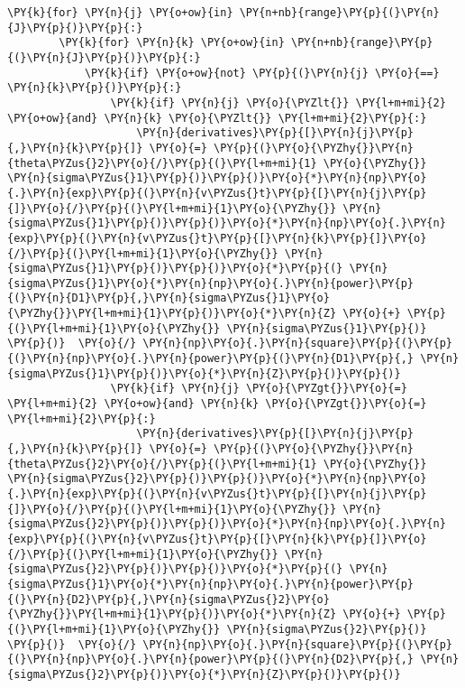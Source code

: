 \begin{tcolorbox}[breakable, size=fbox, boxrule=1pt, pad at break*=1mm,colback=cellbackground, colframe=cellborder]
\begin{Verbatim}[commandchars=\\\{\}]
    \PY{k}{for} \PY{n}{j} \PY{o+ow}{in} \PY{n+nb}{range}\PY{p}{(}\PY{n}{J}\PY{p}{)}\PY{p}{:}
        \PY{k}{for} \PY{n}{k} \PY{o+ow}{in} \PY{n+nb}{range}\PY{p}{(}\PY{n}{J}\PY{p}{)}\PY{p}{:}
            \PY{k}{if} \PY{o+ow}{not} \PY{p}{(}\PY{n}{j} \PY{o}{==} \PY{n}{k}\PY{p}{)}\PY{p}{:}
                \PY{k}{if} \PY{n}{j} \PY{o}{\PYZlt{}} \PY{l+m+mi}{2} \PY{o+ow}{and} \PY{n}{k} \PY{o}{\PYZlt{}} \PY{l+m+mi}{2}\PY{p}{:}
                    \PY{n}{derivatives}\PY{p}{[}\PY{n}{j}\PY{p}{,}\PY{n}{k}\PY{p}{]} \PY{o}{=} \PY{p}{(}\PY{o}{\PYZhy{}}\PY{n}{theta\PYZus{}2}\PY{o}{/}\PY{p}{(}\PY{l+m+mi}{1} \PY{o}{\PYZhy{}} \PY{n}{sigma\PYZus{}1}\PY{p}{)}\PY{p}{)}\PY{o}{*}\PY{n}{np}\PY{o}{.}\PY{n}{exp}\PY{p}{(}\PY{n}{v\PYZus{}t}\PY{p}{[}\PY{n}{j}\PY{p}{]}\PY{o}{/}\PY{p}{(}\PY{l+m+mi}{1}\PY{o}{\PYZhy{}} \PY{n}{sigma\PYZus{}1}\PY{p}{)}\PY{p}{)}\PY{o}{*}\PY{n}{np}\PY{o}{.}\PY{n}{exp}\PY{p}{(}\PY{n}{v\PYZus{}t}\PY{p}{[}\PY{n}{k}\PY{p}{]}\PY{o}{/}\PY{p}{(}\PY{l+m+mi}{1}\PY{o}{\PYZhy{}} \PY{n}{sigma\PYZus{}1}\PY{p}{)}\PY{p}{)}\PY{o}{*}\PY{p}{(} \PY{n}{sigma\PYZus{}1}\PY{o}{*}\PY{n}{np}\PY{o}{.}\PY{n}{power}\PY{p}{(}\PY{n}{D1}\PY{p}{,}\PY{n}{sigma\PYZus{}1}\PY{o}{\PYZhy{}}\PY{l+m+mi}{1}\PY{p}{)}\PY{o}{*}\PY{n}{Z} \PY{o}{+} \PY{p}{(}\PY{l+m+mi}{1}\PY{o}{\PYZhy{}} \PY{n}{sigma\PYZus{}1}\PY{p}{)}   \PY{p}{)}  \PY{o}{/} \PY{n}{np}\PY{o}{.}\PY{n}{square}\PY{p}{(}\PY{p}{(}\PY{n}{np}\PY{o}{.}\PY{n}{power}\PY{p}{(}\PY{n}{D1}\PY{p}{,} \PY{n}{sigma\PYZus{}1}\PY{p}{)}\PY{o}{*}\PY{n}{Z}\PY{p}{)}\PY{p}{)}
                \PY{k}{if} \PY{n}{j} \PY{o}{\PYZgt{}}\PY{o}{=} \PY{l+m+mi}{2} \PY{o+ow}{and} \PY{n}{k} \PY{o}{\PYZgt{}}\PY{o}{=} \PY{l+m+mi}{2}\PY{p}{:}
                    \PY{n}{derivatives}\PY{p}{[}\PY{n}{j}\PY{p}{,}\PY{n}{k}\PY{p}{]} \PY{o}{=} \PY{p}{(}\PY{o}{\PYZhy{}}\PY{n}{theta\PYZus{}2}\PY{o}{/}\PY{p}{(}\PY{l+m+mi}{1} \PY{o}{\PYZhy{}} \PY{n}{sigma\PYZus{}2}\PY{p}{)}\PY{p}{)}\PY{o}{*}\PY{n}{np}\PY{o}{.}\PY{n}{exp}\PY{p}{(}\PY{n}{v\PYZus{}t}\PY{p}{[}\PY{n}{j}\PY{p}{]}\PY{o}{/}\PY{p}{(}\PY{l+m+mi}{1}\PY{o}{\PYZhy{}} \PY{n}{sigma\PYZus{}2}\PY{p}{)}\PY{p}{)}\PY{o}{*}\PY{n}{np}\PY{o}{.}\PY{n}{exp}\PY{p}{(}\PY{n}{v\PYZus{}t}\PY{p}{[}\PY{n}{k}\PY{p}{]}\PY{o}{/}\PY{p}{(}\PY{l+m+mi}{1}\PY{o}{\PYZhy{}} \PY{n}{sigma\PYZus{}2}\PY{p}{)}\PY{p}{)}\PY{o}{*}\PY{p}{(} \PY{n}{sigma\PYZus{}1}\PY{o}{*}\PY{n}{np}\PY{o}{.}\PY{n}{power}\PY{p}{(}\PY{n}{D2}\PY{p}{,}\PY{n}{sigma\PYZus{}2}\PY{o}{\PYZhy{}}\PY{l+m+mi}{1}\PY{p}{)}\PY{o}{*}\PY{n}{Z} \PY{o}{+} \PY{p}{(}\PY{l+m+mi}{1}\PY{o}{\PYZhy{}} \PY{n}{sigma\PYZus{}2}\PY{p}{)}   \PY{p}{)}  \PY{o}{/} \PY{n}{np}\PY{o}{.}\PY{n}{square}\PY{p}{(}\PY{p}{(}\PY{n}{np}\PY{o}{.}\PY{n}{power}\PY{p}{(}\PY{n}{D2}\PY{p}{,} \PY{n}{sigma\PYZus{}2}\PY{p}{)}\PY{o}{*}\PY{n}{Z}\PY{p}{)}\PY{p}{)}

\end{Verbatim}
\end{tcolorbox}
